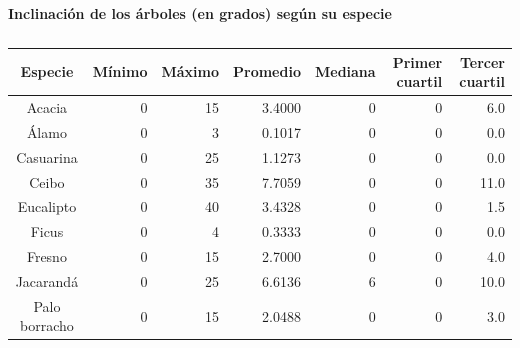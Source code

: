 \documentclass[11pt]{article}
\begin{document}
\begin{table}[h!]
  \begin{center}
    \caption*{\textbf{Inclinación de los árboles (en grados) según su especie}}
    \begin{tabular}{| c | r | r | r | r | r | r |}
      \hline
      \textbf{Especie} & \textbf{Mínimo}         & \textbf{Máximo}         & \textbf{Promedio} &
      \textbf{Mediana} & \textbf{Primer cuartil} & \textbf{Tercer cuartil}                                    \\ \hline
      Acacia           & 0                       & 15                      & 3.4000            & 0 & 0 & 6.0  \\ \hline
      Álamo            & 0                       & 3                       & 0.1017            & 0 & 0 & 0.0  \\ \hline
      Casuarina        & 0                       & 25                      & 1.1273            & 0 & 0 & 0.0  \\ \hline
      Ceibo            & 0                       & 35                      & 7.7059            & 0 & 0 & 11.0 \\ \hline
      Eucalipto        & 0                       & 40                      & 3.4328            & 0 & 0 & 1.5  \\ \hline
      Ficus            & 0                       & 4                       & 0.3333            & 0 & 0 & 0.0  \\ \hline
      Fresno           & 0                       & 15                      & 2.7000            & 0 & 0 & 4.0  \\ \hline
      Jacarandá        & 0                       & 25                      & 6.6136            & 6 & 0 & 10.0 \\ \hline
      Palo borracho    & 0                       & 15                      & 2.0488            & 0 & 0 & 3.0  \\ \hline
    \end{tabular}
    \caption{}
    \label{tab:tablaInclinacionEspecie}
  \end{center}
\end{table}
\end{document}
